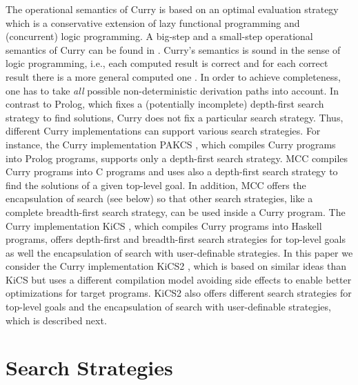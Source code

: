 \documentclass[english]{lni}
\begin{document}
The operational semantics of Curry is based on an optimal evaluation strategy
\cite{AntoyEchahedHanus00JACM} which is a conservative extension
of lazy functional programming and (concurrent) logic programming.
A big-step and a small-step operational semantics of Curry
can be found in \cite{AlbertHanusHuchOliverVidal05}.
Curry's semantics is sound in the sense of logic programming,
i.e., each computed result is correct and for each
correct result there is a more general computed one
\cite{AntoyEchahedHanus00JACM}.
In order to achieve completeness,
one has to take \emph{all} possible non-deterministic derivation paths
into account. In contrast to Prolog, which fixes
a (potentially incomplete) depth-first search strategy to find solutions,
Curry does not fix a particular search strategy.
Thus, different Curry implementations
can support various search strategies.
For instance, the Curry implementation PAKCS \cite{Hanus10PAKCS},
which compiles Curry programs into Prolog programs,
supports only a depth-first search strategy.
MCC \cite{Lux99FLOPS} compiles Curry programs into C programs
and uses also a depth-first search strategy to find the
solutions of a given top-level goal.
In addition, MCC offers the encapsulation of search
(see below) so that other search strategies,
like a complete breadth-first search strategy, can be used
inside a Curry program.
The Curry implementation KiCS \cite{BrasselHuch07,BrasselHuch09},
which compiles Curry programs into Haskell programs,
offers depth-first and breadth-first search strategies
for top-level goals as well the encapsulation of search
with user-definable strategies.
In this paper we consider the Curry implementation
KiCS2 \cite{BrasselHanusPeemoellerReck11},
which is based on similar ideas than KiCS but uses
a different compilation model avoiding side effects
to enable better optimizations for target programs.
KiCS2 also offers different search strategies for top-level goals
and the encapsulation of search with user-definable strategies,
which is described next.


\section{Search Strategies}
\label{sec:strategies}
\end{document}
